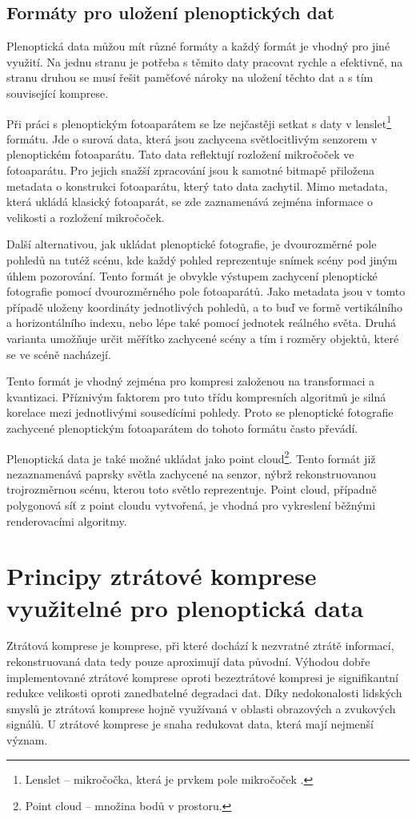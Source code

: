 \section{Formáty pro uložení plenoptických dat}
\label{light-field-formats}
Plenoptická data můžou mít různé formáty a každý formát je vhodný pro jiné využití.
Na jednu stranu je potřeba s těmito daty pracovat rychle a efektivně, na stranu druhou se musí řešit paměťové nároky na uložení těchto dat a s tím související komprese.

Při práci s plenoptickým fotoaparátem se lze nejčastěji setkat s daty v lenslet\footnote{Lenslet -- mikročočka, která je prvkem pole mikročoček \cite{lenslet}.} formátu. Jde o surová data, která jsou zachycena světlocitlivým senzorem v plenoptickém fotoaparátu.
Tato data reflektují rozložení mikročoček ve fotoaparátu.
Pro jejich snažší zpracování jsou k samotné bitmapě přiložena metadata o konstrukci fotoaparátu, který tato data zachytil.
Mimo metadata, která ukládá klasický fotoaparát, se zde zaznamenává zejména informace o velikosti a rozložení mikročoček.

Další alternativou, jak ukládat plenoptické fotografie, je dvourozměrné pole pohledů na tutéž scénu, kde každý pohled reprezentuje snímek scény pod jiným úhlem pozorování.
Tento formát je obvykle výstupem zachycení plenoptické fotografie pomocí dvourozměrného pole fotoaparátů.
Jako metadata jsou v tomto případě uloženy koordináty jednotlivých pohledů, a to buď ve formě vertikálního a horizontálního indexu, nebo lépe také pomocí jednotek reálného světa.
Druhá varianta umožňuje určit měřítko zachycené scény a tím i rozměry objektů, které se ve scéně nacházejí.

Tento formát je vhodný zejména pro kompresi založenou na transformaci a kvantizaci.
Příznivým faktorem pro tuto třídu kompresních algoritmů je silná korelace mezi jednotlivými sousedícími pohledy.
Proto se plenoptické fotografie zachycené plenoptickým fotoaparátem do tohoto formátu často převádí.

Plenoptická data je také možné ukládat jako point cloud\footnote{Point cloud -- množina bodů v prostoru.}.
Tento formát již nezaznamenává paprsky světla zachycené na senzor, nýbrž rekonstruovanou trojrozměrnou scénu, kterou toto světlo reprezentuje.
Point cloud, případně polygonová síť z point cloudu vytvořená, je vhodná pro vykreslení běžnými renderovacími algoritmy.



\chapter{Principy ztrátové komprese využitelné pro plenoptická data}
\label{kompres-teo}
Ztrátová komprese je komprese, při které dochází k nezvratné ztrátě informací, rekonstruovaná data tedy pouze aproximují data původní.
Výhodou dobře implementované ztrátové komprese oproti bezeztrátové kompresi je signifikantní redukce velikosti oproti zanedbatelné degradaci dat.
Díky nedokonalosti lidských smyslů je ztrátová komprese hojně využívaná v oblasti obrazových a zvukových signálů.
U ztrátové komprese je snaha redukovat data, která mají nejmenší význam.

